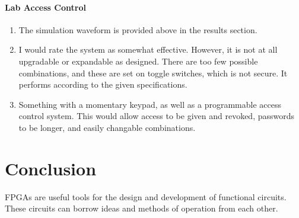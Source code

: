\documentclass{article}
\begin{document}
    \paragraph{Lab Access Control}

    \begin{enumerate}
            \item The simulation waveform is provided above in the results section.

            \item I would rate the system as somewhat effective. However, it is not at all upgradable or expandable as designed.
                There are too few possible combinations, and these are set on toggle switches, which is not
                secure.
                It performs according to the given specifications.

            \item Something with a momentary keypad, as well as a programmable access control system.
                This would allow access to be given and revoked, passwords to be longer, and easily changable
                combinations.

    \end{enumerate}


    \section{Conclusion}
    FPGAs are useful tools for the design and development of functional circuits.
    These circuits can borrow ideas and methods of operation from each other.
\end{document}
